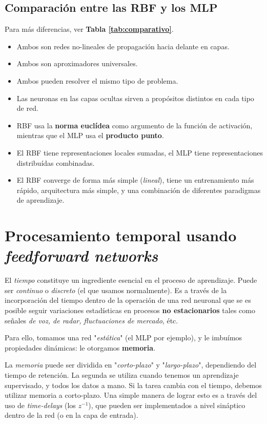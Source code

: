 \documentclass[10pt,a4paper]{article}
\begin{document}
\subsection{Comparación entre las RBF y los MLP}
Para más diferencias, ver \textbf{Tabla \ref{tab:comparativo}}.

\begin{multicols}{2}
\begin{itemize}
\item Ambos son redes no-lineales de propagación hacia delante en capas.
\item Ambos son aproximadores universales.
\item Ambos pueden resolver el mismo tipo de problema.
\item Las neuronas en las capas ocultas sirven a propósitos distintos en cada tipo de red.
\item RBF usa la \textbf{norma euclídea} como argumento de la función de activación, mientras que el MLP usa el \textbf{producto punto}.
\item El RBF tiene representaciones locales sumadas, el MLP tiene representaciones distribuídas combinadas.
\item El RBF converge de forma más simple (\textit{lineal}), tiene un entrenamiento más rápido, arquitectura más simple, y una combinación de diferentes paradigmas de aprendizaje.
\end{itemize}
\end{multicols}

\section{Procesamiento temporal usando \textit{feedforward networks}}

El \textit{tiempo} constituye un ingrediente esencial en el proceso de aprendizaje. Puede ser \textit{continuo} o \textit{discreto} (el que usamos normalmente). Es a través de la incorporación del tiempo dentro de la operación de una red neuronal que se es posible seguir variaciones estadísticas en procesos \textbf{no estacionarios} tales como señales \textit{de voz, de radar, fluctuaciones de mercado}, étc.

Para ello, tomamos una red "\textit{estática}" (el MLP por ejemplo), y le imbuímos propiedades dinámicas: le otorgamos \textbf{memoria}.

La \textit{memoria} puede ser dividida en "\textit{corto-plazo}" y "\textit{largo-plazo}", dependiendo del tiempo de retención. La segunda se utiliza cuando tenemos un aprendizaje supervisado, y todos los datos a mano. Si la tarea cambia con el tiempo, debemos utilizar memoria a corto-plazo. Una simple manera de lograr esto es a través del uso de \textit{time-delays} (los $z^{-1}$), que pueden ser implementados a nivel sináptico dentro de la red (o en la capa de entrada).
\end{document}
